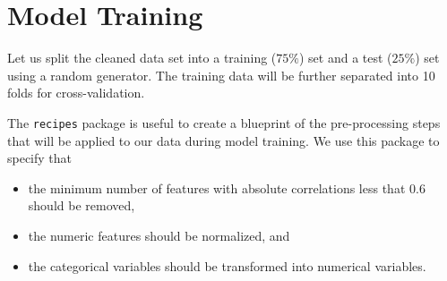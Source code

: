 \documentclass[
  letterpaper,
  DIV=11,
  numbers=noendperiod]{scrartcl}
\newenvironment{Shaded}{\begin{snugshade}}{\end{snugshade}}
\newcommand{\CommentTok}[1]{\textcolor[rgb]{0.37,0.37,0.37}{#1}}
\newcommand{\DecValTok}[1]{\textcolor[rgb]{0.68,0.00,0.00}{#1}}
\newcommand{\FunctionTok}[1]{\textcolor[rgb]{0.28,0.35,0.67}{#1}}
\newcommand{\NormalTok}[1]{\textcolor[rgb]{0.00,0.23,0.31}{#1}}
\newcommand{\OtherTok}[1]{\textcolor[rgb]{0.00,0.23,0.31}{#1}}
\newcommand{\SpecialCharTok}[1]{\textcolor[rgb]{0.37,0.37,0.37}{#1}}
\providecommand{\tightlist}{%
  \setlength{\itemsep}{0pt}\setlength{\parskip}{0pt}}\usepackage{longtable,booktabs,array}
\begin{document}
\section{Model Training}\label{model-training}

Let us split the cleaned data set into a training (\(75\%\)) set and a
test (\(25\%\)) set using a random generator. The training data will be
further separated into 10 folds for cross-validation.

\begin{Shaded}
\end{Shaded}

The \texttt{recipes} package is useful to create a blueprint of the
pre-processing steps that will be applied to our data during model
training. We use this package to specify that

\begin{itemize}
\tightlist
\item
  the minimum number of features with absolute correlations less that
  \(0.6\) should be removed,
\item
  the numeric features should be normalized, and
\item
  the categorical variables should be transformed into numerical
  variables.
\end{itemize}
\end{document}
